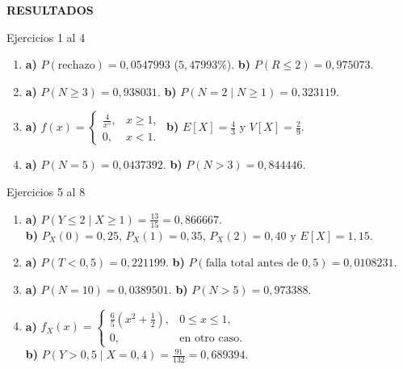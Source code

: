 \documentclass[letterpaper,12pt]{article}
\newenvironment{resultados}{%
    \newpage
    \begin{center}
        \begin{tcolorbox}[
            colback=azulFuerte,
            colframe=azulFuerte,
            colupper=white,
            width=0.8\textwidth,
            center,
            arc=10pt]
            \centering\Large\textbf{RESULTADOS}
        \end{tcolorbox}
    \end{center}
    \small
}{}
\begin{document}
\begin{resultados}

\begin{resultbox}{Ejercicios 1 al 4}
\begin{enumerate}[label=\color{azulFuerte}\bfseries\arabic*.,leftmargin=*,itemsep=0.65em]
    \item \textbf{a)} $P(\text{rechazo})=0{,}0547993$ ($5{,}47993\%$). \quad
          \textbf{b)} $P(R\leq 2)=0{,}975073$.

    \item \textbf{a)} $P(N\geq 3)=0{,}938031$. \quad
          \textbf{b)} $P(N=2\mid N\geq 1)=0{,}323119$.

    \item \textbf{a)} $\displaystyle f(x)=\begin{cases}\frac{4}{x^5},&x\geq 1,\\[1mm]0,&x<1.\end{cases}$ \quad
          \textbf{b)} $\displaystyle E[X]=\frac{4}{3}$ y $\displaystyle V[X]=\frac{2}{9}$.

    \item \textbf{a)} $P(N=5)=0{,}0437392$. \quad
          \textbf{b)} $P(N>3)=0{,}844446$.
\end{enumerate}
\end{resultbox}

\begin{resultbox}{Ejercicios 5 al 8}
\begin{enumerate}[label=\color{azulFuerte}\bfseries\arabic*.,start=5,leftmargin=*,itemsep=0.65em]
    \item \textbf{a)} $\displaystyle P(Y\leq 2\mid X\geq 1)=\frac{13}{15}=0{,}866667$. \\
          \textbf{b)} $P_X(0)=0{,}25$, $P_X(1)=0{,}35$, $P_X(2)=0{,}40$ y $E[X]=1{,}15$.

    \item \textbf{a)} $P(T<0{,}5)=0{,}221199$. \quad
          \textbf{b)} $P(\text{falla total antes de }0{,}5)=0{,}0108231$.

    \item \textbf{a)} $P(N=10)=0{,}0389501$. \quad
          \textbf{b)} $P(N>5)=0{,}973388$.

    \item \textbf{a)} $\displaystyle f_X(x)=\begin{cases}\frac{6}{5}\left(x^2+\frac12\right),&0\leq x\leq 1,\\[1mm]0,&\text{en otro caso.}\end{cases}$ \\
          \textbf{b)} $\displaystyle P(Y>0{,}5\mid X=0{,}4)=\frac{91}{132}=0{,}689394$.
\end{enumerate}
\end{resultbox}


\end{resultados}
\end{document}
